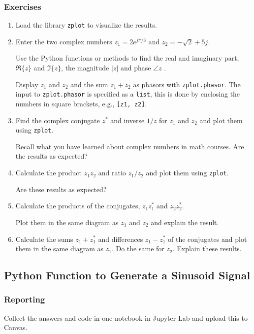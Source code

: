 \subsubsection*{Exercises}	
\begin{enumerate}[1)]
	\item Load the library \verb|zplot| to visualize the results.

	\item Enter the two complex numbers $z_1 = 2e^{j\pi/3}$ and $z_2= -\sqrt{2} + 5j$. 
	
		Use the Python functions or methods to find the real and imaginary part, $\Re\{z\}$ and $\Im\{z\}$, the magnitude $|z|$ and phase $\angle z$ .
	
		Display $z_1$ and $z_2$ and the sum $z_1+z_2$ as phasors with \verb|zplot.phasor|. 		
		The input to \verb|zplot.phasor| is specified as a \verb|list|, this is done by enclosing the numbers in square brackets, e.g., \verb|[z1, z2]|.

	\item Find the complex conjugate $z^*$ and inverse $1/z$ for $z_1$ and $z_2$ and plot them using \verb|zplot|.
	
		Recall what you have learned about complex numbers in math courses. Are the results as expected?
			
	\item Calculate the product $z_1 z_2$ and ratio $z_1/z_2$ and plot them using \verb|zplot|. 
	
		Are these results as expected?

	\item Calculate the products of the conjugates, $z_1 z_1^*$ and $z_2 z_2^*$. 
	
	Plot them in the same diagram as $z_1$ and $z_2$ and explain the result.

	\item Calculate the sums $z_1+z_1^*$ and differences $z_1-z_1^*$ of the conjugates and plot them in the same diagram as $z_1$. Do the same for $z_2$. Explain these results.
		
\end{enumerate}

		
		
\subsection{Python Function to Generate a Sinusoid Signal }

\subsubsection*{Reporting}	
Collect the answers and code in one notebook in Jupyter Lab and upload this to Canvas.

